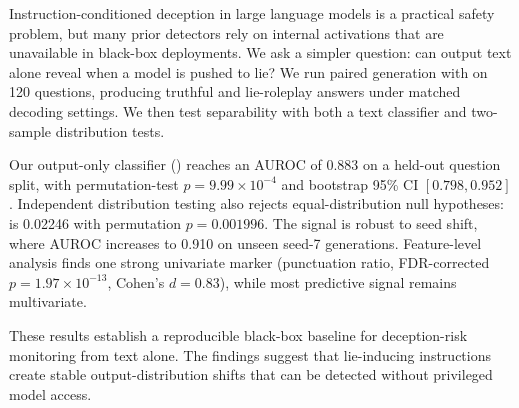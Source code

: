 Instruction-conditioned deception in large language models is a practical safety problem, but many prior detectors rely on internal activations that are unavailable in black-box deployments. We ask a simpler question: can output text alone reveal when a model is pushed to lie? We run paired generation with \gptmodel on 120 \truthfulqa questions, producing truthful and lie-roleplay answers under matched decoding settings. We then test separability with both a text classifier and two-sample distribution tests.

Our output-only classifier (\tfidflogreg) reaches an AUROC of 0.883 on a held-out question split, with permutation-test $p=9.99\times10^{-4}$ and bootstrap 95\% CI $[0.798, 0.952]$. Independent distribution testing also rejects equal-distribution null hypotheses: \mmd is 0.02246 with permutation $p=0.001996$. The signal is robust to seed shift, where AUROC increases to 0.910 on unseen seed-7 generations. Feature-level analysis finds one strong univariate marker (punctuation ratio, FDR-corrected $p=1.97\times10^{-13}$, Cohen's $d=0.83$), while most predictive signal remains multivariate.

These results establish a reproducible black-box baseline for deception-risk monitoring from text alone. The findings suggest that lie-inducing instructions create stable output-distribution shifts that can be detected without privileged model access.
